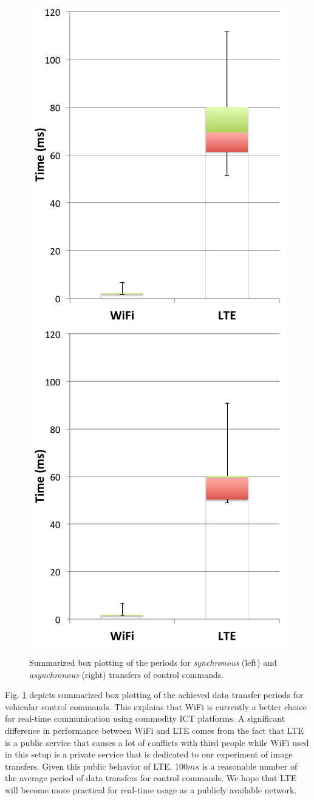 \begin{figure}[!t]
 \centering
 \includegraphics[width=0.45\hsize]{fig/No3_Andrive_boxplot_compare_WiFi_and_LTE.pdf}
 \includegraphics[width=0.45\hsize]{fig/No7_Andrive_only_send_boxplot_compare_WiFi_and_LTE.pdf}
 \caption{Summarized box plotting of the periods for
 \textit{synchronous} (left) and \textit{asynchronous} (right) transfers
 of control commands.}
 \label{fig:no3_7}
\end{figure}

Fig. \ref{fig:no3_7} depicts summarized box plotting of the achieved
data transfer periods for vehicular control commands.
This explains that WiFi is currently a better choice for real-time
communication using commodity ICT platforms.
A significant difference in performance between WiFi and LTE comes from
the fact that LTE is a public service that causes a lot of conflicts
with third people while WiFi used in this setup is a private service
that is dedicated to our experiment of image transfers.
Given this public behavior of LTE, $100ms$ is a reasonable number of the
average period of data transfers for control commands.
We hope that LTE will become more practical for real-time usage as a
publicly available network.

